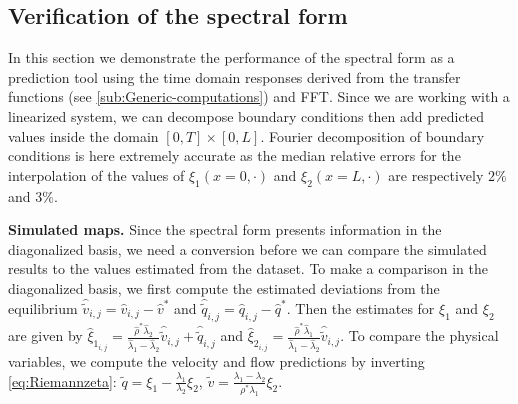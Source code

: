 \documentclass[preprint]{elsarticle}
\begin{document}
\subsection{Verification of the spectral form}
In this section we demonstrate the performance of the spectral form as a prediction tool using the time domain responses derived from the transfer functions (see \ref{sub:Generic-computations}) and FFT. Since we are working with a linearized system, we can decompose boundary conditions then add predicted values inside the domain $\left[0,T\right]\times\left[0,L\right]$. Fourier decomposition of boundary conditions is here extremely accurate as the median relative errors for the interpolation of the values of $\xi_{1}\left(x=0, \cdot \right)$ and $\xi_{2}\left(x=L, \cdot \right)$ are respectively $2\%$ and $3\%$.


\textbf{Simulated maps.} Since the spectral form presents information in the diagonalized basis, we need a conversion before we can compare the simulated results to the values estimated from the dataset.  
To make a comparison in the diagonalized basis, we first compute the estimated deviations from the equilibrium $\widehat{\widetilde{v}}_{i,j}=\widehat{v}_{i,j}-\widehat{v}^{*}$ and $\widehat{\widetilde{q}}_{i,j}=\widehat{q}_{i,j}-\widehat{q}^{*}$. Then the estimates for $\xi_{1}$ and $\xi_{2}$ are given by $\widehat{\xi}_{1_{i,j}}=\frac{\widehat{\rho}^{*}\widehat{\lambda}_{2}}{\widehat{\lambda}_{1}-\widehat{\lambda}_{2}}\widehat{\widetilde{v}}_{i,j}+\widehat{\widetilde{q}}_{i,j}$ and
$\widehat{\xi}_{2_{i,j}}=\frac{\widehat{\rho}^{*}\widehat{\lambda}_{1}}{\widehat{\lambda}_{1}-\widehat{\lambda}_{2}}\widehat{\widetilde{v}}_{i,j}$. To compare the physical variables, we compute the velocity and flow predictions by inverting \eqref{eq:Riemannzeta}: $\widetilde{q}=\xi_{1}-\frac{\lambda_{1}}{\lambda_{2}}\xi_{2}$,
$\widetilde{v}=\frac{\lambda_{1}-\lambda_{2}}{\rho^{*}\lambda_{1}}\xi_{2}$.
\end{document}
